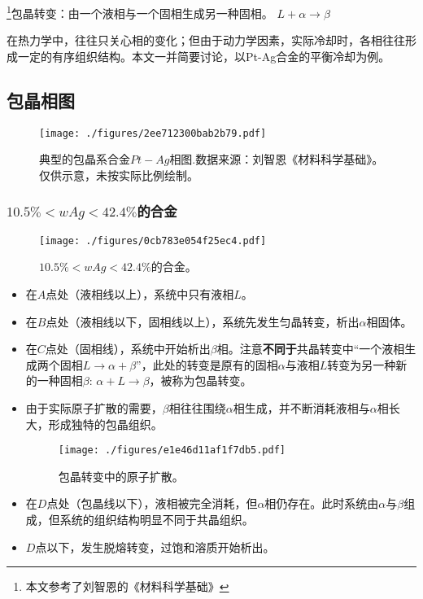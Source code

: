 

\footnote{本文参考了刘智恩的《材料科学基础》}包晶转变：由一个液相与一个固相生成另一种固相。 $L + \alpha \rightarrow \beta$

在热力学中，往往只关心相的变化；但由于动力学因素，实际冷却时，各相往往形成一定的有序组织结构。本文一并简要讨论，以Pt-Ag合金的平衡冷却为例。

\subsection{包晶相图}

\begin{figure}[ht]
\centering
\texttt{[image: ./figures/2ee712300bab2b79.pdf]}
\caption{典型的包晶系合金$Pt-Ag$相图.数据来源：刘智恩《材料科学基础》。仅供示意，未按实际比例绘制。} \label{fig_PERITC_4}
\end{figure}

\subsubsection{$10.5\%<wAg<42.4\%$的合金} 
\begin{figure}[ht]
\centering
\texttt{[image: ./figures/0cb783e054f25ec4.pdf]}
\caption{$10.5\%<wAg<42.4\%$的合金。} \label{fig_PERITC_2}
\end{figure}

\begin{itemize}
\item 在$A$点处（液相线以上），系统中只有液相$L$。
\item 在$B$点处（液相线以下，固相线以上），系统先发生匀晶转变，析出$\alpha$相固体。
\item 在$C$点处（固相线），系统中开始析出$\beta$相。注意\textbf{不同于}共晶转变中“一个液相生成两个固相$L\to\alpha+\beta$”，此处的转变是原有的固相$\alpha$与液相$L$转变为另一种新的一种固相$\beta$: $\alpha+L\to\beta$，被称为包晶转变。
\item 由于实际原子扩散的需要，$\beta$相往往围绕$\alpha$相生成，并不断消耗液相与$\alpha$相长大，形成独特的包晶组织。
\begin{figure}[ht]
\centering
\texttt{[image: ./figures/e1e46d11af1f7db5.pdf]}
\caption{包晶转变中的原子扩散。} \label{fig_PERITC_6}
\end{figure}
\item 在$D$点处（包晶线以下），液相被完全消耗，但$\alpha$相仍存在。此时系统由$\alpha$与$\beta$组成，但系统的组织结构明显不同于共晶组织。
\item $D$点以下，发生脱熔转变，过饱和溶质开始析出。
\end{itemize}

